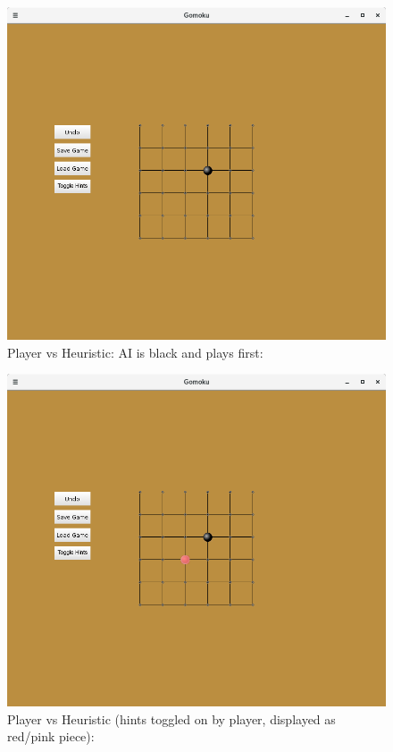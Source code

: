 \documentclass[11]{article}
\begin{document}
\begin{figure}[h]
					\caption{Player vs Heuristic: AI is black and plays first:}				\centering
					\includegraphics[scale=0.5]{Heuristic1.png}
\end{figure}

\begin{figure}[h]
					\caption{Player vs Heuristic (hints toggled on by player, displayed as red/pink piece):}				\centering
					\includegraphics[scale=0.5]{Heuristic2.png}
\end{figure}
\end{document}
